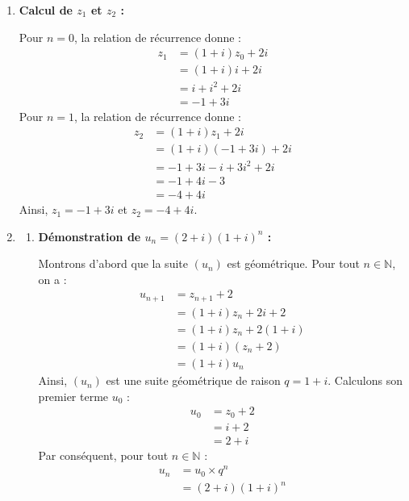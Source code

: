 \documentclass[12pt,a4paper]{article}
\begin{document}
\begin{enumerate}
    \item \textbf{Calcul de $z_1$ et $z_2$ :}
    
    Pour $n = 0$, la relation de récurrence donne :
    $$
    \begin{aligned}
        z_1 &= (1 + i)z_0 + 2i \\
        &= (1 + i)i + 2i \\
        &= i + i^2 + 2i \\
        &= -1 + 3i
    \end{aligned}
    $$
    Pour $n = 1$, la relation de récurrence donne :
    $$
    \begin{aligned}
        z_2 &= (1 + i)z_1 + 2i \\
        &= (1 + i)(-1 + 3i) + 2i \\
        &= -1 + 3i - i + 3i^2 + 2i \\
        &= -1 + 4i - 3 \\
        &= -4 + 4i
    \end{aligned}
    $$
    Ainsi, $z_1 = -1 + 3i$ et $z_2 = -4 + 4i$.

    \item 
    \begin{enumerate}
        \item \textbf{Démonstration de $u_n = (2 + i)(1 + i)^n$ :}
        
        Montrons d'abord que la suite $(u_n)$ est géométrique. Pour tout $n \in \mathbb{N}$, on a :
        $$
        \begin{aligned}
            u_{n+1} &= z_{n+1} + 2 \\
            &= (1 + i)z_n + 2i + 2 \\
            &= (1 + i)z_n + 2(1 + i) \\
            &= (1 + i)(z_n + 2) \\
            &= (1 + i)u_n
        \end{aligned}
        $$
        Ainsi, $(u_n)$ est une suite géométrique de raison $q = 1 + i$. Calculons son premier terme $u_0$ :
        $$
        \begin{aligned}
            u_0 &= z_0 + 2 \\
            &= i + 2 \\
            &= 2 + i
        \end{aligned}
        $$
        Par conséquent, pour tout $n \in \mathbb{N}$ :
        $$
        \begin{aligned}
            u_n &= u_0 \times q^n \\
            &= (2 + i)(1 + i)^n
        \end{aligned}
        $$


\end{enumerate}
\end{enumerate}
\end{document}
